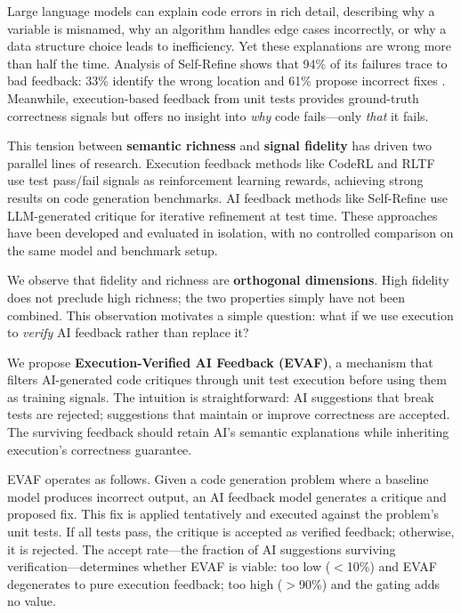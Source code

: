 
Large language models can explain code errors in rich detail, describing why a variable is misnamed, why an algorithm handles edge cases incorrectly, or why a data structure choice leads to inefficiency. Yet these explanations are wrong more than half the time. Analysis of Self-Refine shows that 94\% of its failures trace to bad feedback: 33\% identify the wrong location and 61\% propose incorrect fixes \citep{madaan2023selfrefine}. Meanwhile, execution-based feedback from unit tests provides ground-truth correctness signals but offers no insight into \emph{why} code fails---only \emph{that} it fails.

This tension between \textbf{semantic richness} and \textbf{signal fidelity} has driven two parallel lines of research. Execution feedback methods like CodeRL \citep{le2022coderl} and RLTF \citep{liu2023rltf} use test pass/fail signals as reinforcement learning rewards, achieving strong results on code generation benchmarks. AI feedback methods like Self-Refine use LLM-generated critique for iterative refinement at test time. These approaches have been developed and evaluated in isolation, with no controlled comparison on the same model and benchmark setup.

We observe that fidelity and richness are \textbf{orthogonal dimensions}. High fidelity does not preclude high richness; the two properties simply have not been combined. This observation motivates a simple question: what if we use execution to \emph{verify} AI feedback rather than replace it?

We propose \textbf{Execution-Verified AI Feedback (EVAF)}, a mechanism that filters AI-generated code critiques through unit test execution before using them as training signals. The intuition is straightforward: AI suggestions that break tests are rejected; suggestions that maintain or improve correctness are accepted. The surviving feedback should retain AI's semantic explanations while inheriting execution's correctness guarantee.

EVAF operates as follows. Given a code generation problem where a baseline model produces incorrect output, an AI feedback model generates a critique and proposed fix. This fix is applied tentatively and executed against the problem's unit tests. If all tests pass, the critique is accepted as verified feedback; otherwise, it is rejected. The accept rate---the fraction of AI suggestions surviving verification---determines whether EVAF is viable: too low ($<$10\%) and EVAF degenerates to pure execution feedback; too high ($>$90\%) and the gating adds no value.

